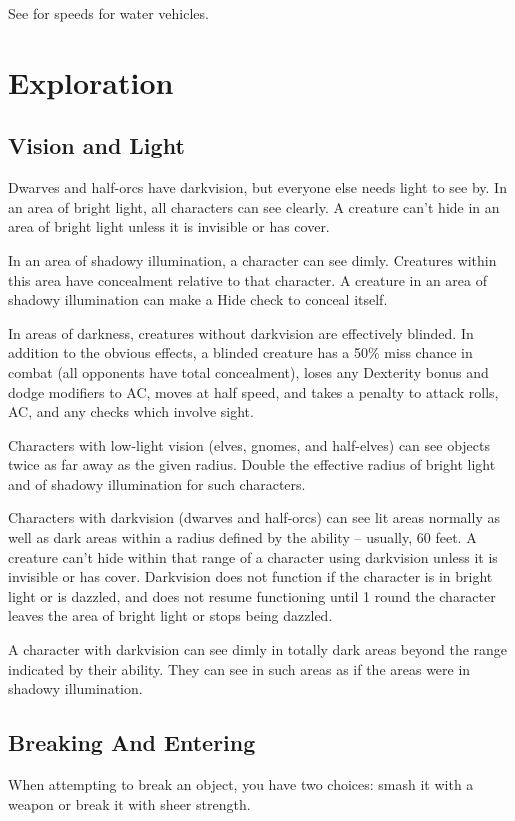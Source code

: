  See  for speeds for water vehicles.

\section{Exploration}
\subsection{Vision and Light}
Dwarves and half-orcs have darkvision, but everyone else needs light to see by.  In an area of bright light, all characters can see clearly. A creature can't hide in an area of bright light unless it is invisible or has cover.

In an area of shadowy illumination, a character can see dimly. Creatures within this area have concealment relative to that character. A creature in an area of shadowy illumination can make a Hide check to conceal itself.

In areas of darkness, creatures without darkvision are effectively blinded. In addition to the obvious effects, a blinded creature has a 50\% miss chance in combat (all opponents have total concealment), loses any Dexterity bonus and dodge modifiers to AC, moves at half speed, and takes a  penalty to attack rolls, AC, and any checks which involve sight.

Characters with low-light vision (elves, gnomes, and half-elves) can see objects twice as far away as the given radius. Double the effective radius of bright light and of shadowy illumination for such characters.

Characters with darkvision (dwarves and half-orcs) can see lit areas normally as well as dark areas within a radius defined by the ability -- usually, 60 feet. A creature can't hide within that range of a character using darkvision unless it is invisible or has cover. Darkvision does not function if the character is in bright light or is dazzled, and does not resume functioning until 1 round the character leaves the area of bright light or stops being dazzled.

A character with darkvision can see dimly in totally dark areas beyond the range indicated by their ability. They can see in such areas as if the areas were in shadowy illumination.

\subsection{Breaking And Entering}
When attempting to break an object, you have two choices: smash it with a weapon or break it with sheer strength.

